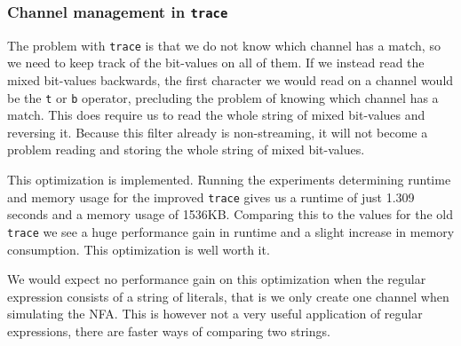 \subsubsection{Channel management in \lstinline{trace}}

The problem with \lstinline{trace} is that we do not know which
channel has a match, so we need to keep track of the bit-values on all
of them. If we instead read the mixed bit-values backwards, the first
character we would read on a channel would be the \texttt{t} or
\texttt{b} operator, precluding the problem of knowing which channel
has a match. This does require us to read the whole string of mixed
bit-values and reversing it. Because this filter already is
non-streaming, it will not become a problem reading and storing the
whole string of mixed bit-values.

This optimization is implemented. Running the experiments determining
runtime and memory usage for the improved \texttt{trace} gives us a
runtime of just 1.309 seconds and a memory usage of 1536KB. Comparing
this to the values for the old \lstinline{trace} we see a huge
performance gain in runtime and a slight increase in memory
consumption. This optimization is well worth it.

We would expect no performance gain on this optimization when the
regular expression consists of a string of literals, that is we only
create one channel when simulating the NFA. This is however not a very
useful application of regular expressions, there are faster ways of
comparing two strings.
